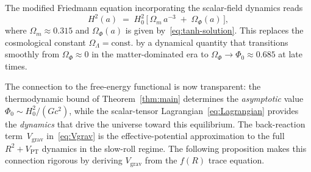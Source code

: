 \documentclass[12pt,a4paper]{article}
\theoremstyle{definition}
\theoremstyle{plain}
\theoremstyle{remark}
\begin{document}
The modified Friedmann equation incorporating the scalar-field dynamics
reads
\begin{equation}\label{eq:modified-Friedmann}
  H^{2}(a) \;=\; H_{0}^{2}\,
  \bigl[\,\Omega_{m}\,a^{-3} \;+\; \Omega_{\Phi}(a)\,\bigr],
\end{equation}
where $\Omega_{m} \approx 0.315$ and $\Omega_{\Phi}(a)$ is given
by~\eqref{eq:tanh-solution}. This replaces the cosmological constant
$\Omega_{\Lambda} = \mathrm{const.}$ by a dynamical quantity that
transitions smoothly from $\Omega_{\Phi} \approx 0$ in the
matter-dominated era to $\Omega_{\Phi} \to \Phi_{0} \approx 0.685$
at late times.

\medskip
The connection to the free-energy functional is now transparent: the
thermodynamic bound of Theorem~\ref{thm:main} determines the
\emph{asymptotic} value $\Phi_{0} \sim H_{0}^{2}/(Gc^{2})$, while the
scalar-tensor Lagrangian~\eqref{eq:Lagrangian} provides the
\emph{dynamics} that drive the universe toward this equilibrium. The
back-reaction term~$V_{\mathrm{grav}}$ in~\eqref{eq:Vgrav} is the
effective-potential approximation to the full $R^{2} + V_{\mathrm{PT}}$
dynamics in the slow-roll regime. The following proposition makes this
connection rigorous by deriving $V_{\mathrm{grav}}$ from the $f(R)$
trace equation.
\end{document}
